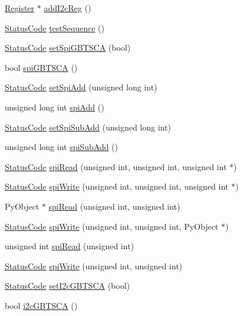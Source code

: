 \begin{DoxyCompactItemize}
\hyperlink{classRegister}{Register} $\ast$ \hyperlink{classFePGA_a64feabdb09e65b1b4b1376a4da713570}{addI2cReg} ()
\item 
\hyperlink{classStatusCode}{StatusCode} \hyperlink{classFePGA_a3d5a3231a960cd451bb37bb9120422e9}{testSequence} ()
\item 
\hyperlink{classStatusCode}{StatusCode} \hyperlink{classFePGA_a59b840619341df26918a6c26e8b8e72b}{setSpiGBTSCA} (bool)
\item 
bool \hyperlink{classFePGA_ad305543bda4d68fe181cd7fa614b2fe1}{spiGBTSCA} ()
\item 
\hyperlink{classStatusCode}{StatusCode} \hyperlink{classFePGA_a2cd235d1971625d6742d4f3107489a07}{setSpiAdd} (unsigned long int)
\item 
unsigned long int \hyperlink{classFePGA_a721de3fa12e207392cd6156027d2c776}{spiAdd} ()
\item 
\hyperlink{classStatusCode}{StatusCode} \hyperlink{classFePGA_ad0a662adc6070427f0e1962c20a92de6}{setSpiSubAdd} (unsigned long int)
\item 
unsigned long int \hyperlink{classFePGA_a6637adb1cd981cf398ea9f1c3feafe83}{spiSubAdd} ()
\item 
\hyperlink{classStatusCode}{StatusCode} \hyperlink{classFePGA_a637b93fed75b576a54e723acb36cb6a3}{spiRead} (unsigned int, unsigned int, unsigned int $\ast$)
\item 
\hyperlink{classStatusCode}{StatusCode} \hyperlink{classFePGA_ac3e8b10fc267b44fef1e651cab77d2ab}{spiWrite} (unsigned int, unsigned int, unsigned int $\ast$)
\item 
PyObject $\ast$ \hyperlink{classFePGA_a41fb676237f8906ec5a0c1b9084ad33e}{spiRead} (unsigned int, unsigned int)
\item 
\hyperlink{classStatusCode}{StatusCode} \hyperlink{classFePGA_aa6aebdd1ccb236f9009a29243f3c7c2b}{spiWrite} (unsigned int, unsigned int, PyObject $\ast$)
\item 
unsigned int \hyperlink{classFePGA_a165f5b70ad30af106ecf9a3ace71d4eb}{spiRead} (unsigned int)
\item 
\hyperlink{classStatusCode}{StatusCode} \hyperlink{classFePGA_ab41df6b1d6a147fbf5611e54058f902d}{spiWrite} (unsigned int, unsigned int)
\item 
\hyperlink{classStatusCode}{StatusCode} \hyperlink{classFePGA_ac9a16de5f01fda901494abe61efb5029}{setI2cGBTSCA} (bool)
\item 
bool \hyperlink{classFePGA_a210cf57766c4f818ea61af671e91cfeb}{i2cGBTSCA} ()
\item 

\end{DoxyCompactItemize}
